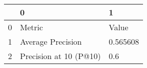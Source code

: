 \begin{tabular}{lll}
\toprule
{} &                       0 &         1 \\
\midrule
0 &                  Metric &     Value \\
1 &       Average Precision &  0.565608 \\
2 &  Precision at 10 (P@10) &       0.6 \\
\bottomrule
\end{tabular}

